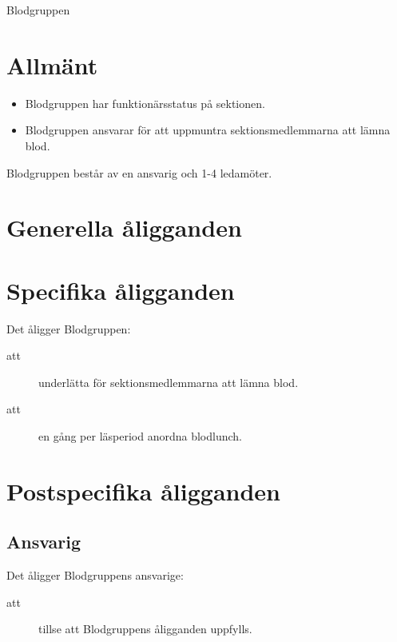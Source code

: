 \documentclass[a4paper]{article}
\begin{document}
\renewcommand{\forening}{Blodgruppen} %

\begin{foreningenv}{\forening{}} %
    \section{Allmänt}
    \begin{itemize}
        \item Blodgruppen har funktionärsstatus på sektionen.
        \item Blodgruppen ansvarar för att uppmuntra sektionsmedlemmarna att lämna blod.
    \end{itemize}
    Blodgruppen består av en ansvarig och 1-4 ledamöter.
    
    
    \section{Generella åligganden}
    \aliggsektfunkt{} %
        
    \section{Specifika åligganden}
    Det åligger \forening{}:
    \begin{description}
          \item[att] underlätta för sektionsmedlemmarna att lämna blod.
          \item[att] en gång per läsperiod anordna blodlunch.
    \end{description}
    
    \section{Postspecifika åligganden}
    \subsection{Ansvarig}
    Det åligger Blodgruppens ansvarige:
    \begin{description}
          \item[att] tillse att Blodgruppens åligganden uppfylls.
    \end{description}
\end{foreningenv}
\end{document}
